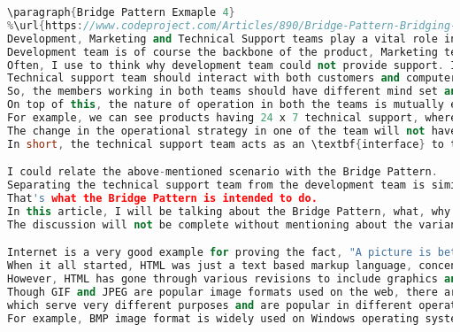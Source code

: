 \documentclass{book}
\begin{document}
\begin{lstlisting}[caption={Bridge Pattern sample code 2},label={lst:bridgepsc2},language=C++]
\paragraph{Bridge Pattern Exmaple 4}
%\url{https://www.codeproject.com/Articles/890/Bridge-Pattern-Bridging-the-gap-between-Interface}
Development, Marketing and Technical Support teams play a vital role in the success of a software product.
Development team is of course the backbone of the product, Marketing team plays a key role in selling the product and Technical support team provides after sales support to the customers.
Often, I use to think why development team could not provide support. I found the answer only after a very long time.
Technical support team should interact with both customers and computers, whereas the development team spends most of their time in hacking computers.
So, the members working in both teams should have different mind set and have totally different roles to play.
On top of this, the nature of operation in both the teams is mutually exclusive.
For example, we can see products having 24 x 7 technical support, whereas the development team hardly works round the clock.
The change in the operational strategy in one of the team will not have a direct impact on the other.
In short, the technical support team acts as an \textbf{interface} to the product whereas the development team \textbf{implements} the product.

I could relate the above-mentioned scenario with the Bridge Pattern.
Separating the technical support team from the development team is similar to isolating the abstraction from implementation.
That's what the Bridge Pattern is intended to do.
In this article, I will be talking about the Bridge Pattern, what, why and when it is needed. Benefits and drawbacks in using the Bridge Pattern are also presented.
The discussion will not be complete without mentioning about the variants and known uses of the Bridge Pattern in popular libraries. Let me start the discussion with a simple programming example.

Internet is a very good example for proving the fact, "A picture is better than thousand words".
When it all started, HTML was just a text based markup language, concentrating mainly on the structure of the document but not its presentation.
However, HTML has gone through various revisions to include graphics and images. Now, thousands of web sites, spread all over the Internet, contains GIF and JPEG images.
Though GIF and JPEG are popular image formats used on the web, there are hundreds of other image formats such as BMP, PCX, TIFF, TARGA etc.,
which serve very different purposes and are popular in different operating systems.
For example, BMP image format is widely used on Windows operating systems, however its existence is also there on OS/2, Macintosh and UNIX operating systems.


\end{lstlisting}
\end{document}
